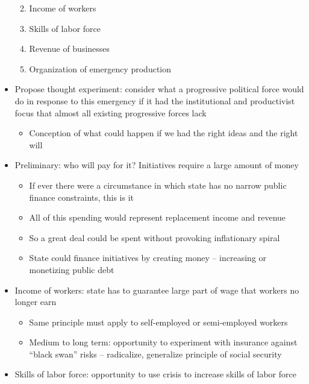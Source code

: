\begin{itemize}
  \begin{enumerate}
  \def\labelenumi{\arabic{enumi}.}
  \tightlist
  \item
    Income of workers
  \item
    Skills of labor force
  \item
    Revenue of businesses
  \item
    Organization of emergency production
  \end{enumerate}
\item
  Propose thought experiment: consider what a progressive political
  force would do in response to this emergency if it had the
  institutional and productivist focus that almost all existing
  progressive forces lack

  \begin{itemize}
  \tightlist
  \item
    Conception of what could happen if we had the right ideas and the
    right will
  \end{itemize}
\item
  Preliminary: who will pay for it? Initiatives require a large amount
  of money

  \begin{itemize}
  \tightlist
  \item
    If ever there were a circumstance in which state has no narrow
    public finance constraints, this is it
  \item
    All of this spending would represent replacement income and revenue
  \item
    So a great deal could be spent without provoking inflationary spiral
  \item
    State could finance initiatives by creating money -- increasing or
    monetizing public debt
  \end{itemize}
\item
  Income of workers: state has to guarantee large part of wage that
  workers no longer earn

  \begin{itemize}
  \tightlist
  \item
    Same principle must apply to self-employed or semi-employed workers
  \item
    Medium to long term: opportunity to experiment with insurance
    against ``black swan'' risks -- radicalize, generalize principle of
    social security
  \end{itemize}
\item
  Skills of labor force: opportunity to use crisis to increase skills of
  labor force


\end{itemize}
